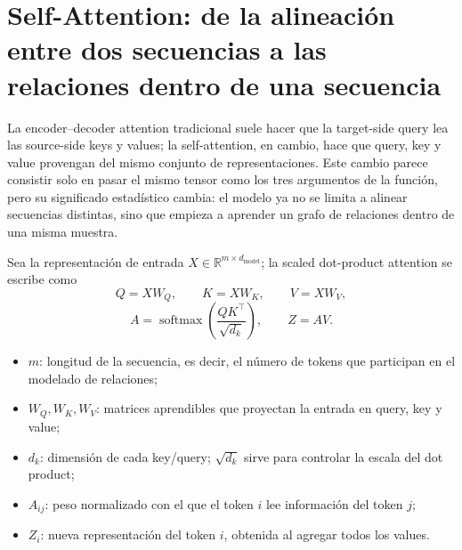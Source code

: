 \section{Self-Attention: de la alineación entre dos secuencias a las relaciones dentro de una secuencia}

La encoder--decoder attention tradicional suele hacer que la target-side query lea las source-side keys y values; la self-attention, en cambio, hace que query, key y value provengan del mismo conjunto de representaciones. Este cambio parece consistir solo en pasar el mismo tensor como los tres argumentos de la función, pero su significado estadístico cambia: el modelo ya no se limita a alinear secuencias distintas, sino que empieza a aprender un grafo de relaciones dentro de una misma muestra.


Sea la representación de entrada $X\in\mathbb{R}^{m\times d_{\mathrm{model}}}$; la scaled dot-product attention se escribe como
\[
Q=XW_Q,\qquad K=XW_K,\qquad V=XW_V,
\]
\[
A=\operatorname{softmax}\!\left(\frac{QK^{\top}}{\sqrt{d_k}}\right),
\qquad Z=AV.
\]

\begin{itemize}
  \item $m$: longitud de la secuencia, es decir, el número de tokens que participan en el modelado de relaciones;
  \item $W_Q,W_K,W_V$: matrices aprendibles que proyectan la entrada en query, key y value;
  \item $d_k$: dimensión de cada key/query; $\sqrt{d_k}$ sirve para controlar la escala del dot product;
  \item $A_{ij}$: peso normalizado con el que el token $i$ lee información del token $j$;
  \item $Z_i$: nueva representación del token $i$, obtenida al agregar todos los values.
\end{itemize}


